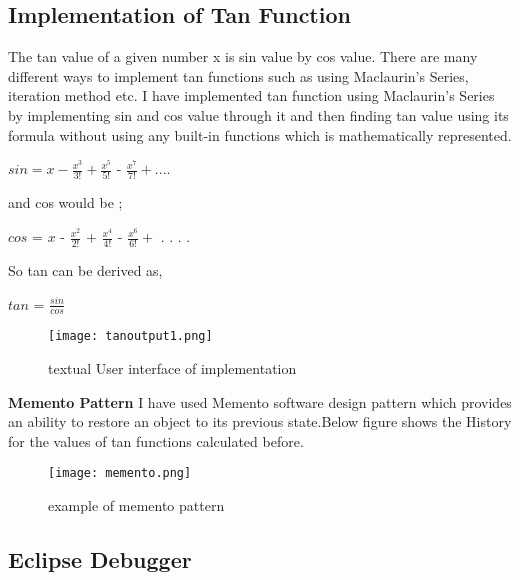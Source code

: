 \documentclass[12pt]{report}
\begin{document}
\subsection{Implementation of Tan Function}
\noindent The tan value of a given number x is sin value by cos value.
There are many different ways to implement tan functions such as using Maclaurin’s Series, iteration  method etc.
I have implemented tan function using Maclaurin’s Series by implementing sin and cos value through it and then finding tan value using its formula without using any built-in functions which is mathematically represented.
\newline
\noindent
\begin{center}
     $sin = x - \frac{x^3}{3!} + \frac{x^5}{5!}$ - $\frac{x^7}{7!} + . . . . $
\end{center}
and cos would be ;
\begin{center}
    $cos$ = $x$ - $\frac{x^2}{2!}$ + $\frac{x^4}{4!}$ - $\frac{x^6}{6!} +$ . . . .
\end{center}
So tan can be derived as,
\begin{center}
    $tan$ = $\frac{sin}{cos}$
\end{center}
\newline
\noindent
\begin{figure}[h!]
  \begin{center}
  \texttt{[image: tanoutput1.png]}
  \end{center}  
    \caption{textual User interface of implementation}
\end{figure}
\item\textbf{Memento Pattern}
\newline
\newline
I have used Memento software design pattern which provides an ability to restore an object to its previous state.Below figure shows the History for the values of tan functions calculated before.
\begin{figure}[h!]
  \begin{center}
  \texttt{[image: memento.png]}
  \end{center}  
    \caption{example of  memento pattern}
\end{figure}

\clearpage
\subsection{Eclipse Debugger}
 \noindent
 
\end{document}
